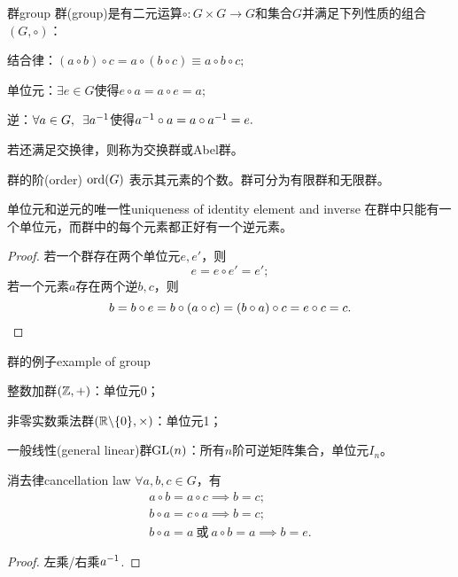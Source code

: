 \begin{definition}{群}{group}
	群(group)是有二元运算$\circ:G\times G\to G$和集合$G$并满足下列性质的组合$(G,\circ)$：
	\begin{compactitem}
		\item 结合律：$(a\circ b)\circ c=a\circ(b\circ c)\equiv a\circ b\circ c;$
		\item 单位元：$\exists e\in G$使得$e\circ a=a\circ e=a;$
		\item 逆：$\forall a\in G,\enspace\exists a^{-1}$使得$a^{-1}\circ a=a\circ a^{-1}=e.$
	\end{compactitem}
	若还满足交换律，则称为交换群或Abel群。

	\tcblower
	群的阶(order) $\operatorname{ord}(G)$ 表示其元素的个数。群可分为有限群和无限群。
\end{definition}
\begin{theorem}{单位元和逆元的唯一性}{uniqueness of identity element and inverse}
	在群中只能有一个单位元，而群中的每个元素都正好有一个逆元素。
\end{theorem}
\begin{proof}
	若一个群存在两个单位元$e,e'$，则 
	\[
		e=e\circ e'=e';
	\]
	若一个元素$a$存在两个逆$b,c$，则 
	\[
		b=b\circ e=b\circ(a\circ c)=(b\circ a)\circ c=e\circ c=c.
		\qedhere
	\]
\end{proof}
\begin{example}{群的例子}{example of group}
	\begin{compactitem}
		\item 整数加群$(\mathbb Z,+)$：单位元0；
		\item 非零实数乘法群$(\mathbb R\backslash\{0\},\times)$：单位元1；
		\item 一般线性(general linear)群$\operatorname{GL}(n)$：所有$n$阶可逆矩阵集合，单位元$I_n$。
	\end{compactitem}
\end{example}
\begin{theorem}{消去律}{cancellation law}
	$\forall a,b,c\in G$，有
	\begin{subequations}
		\begin{gather}
			a\circ b=a\circ c\implies b=c;\\
			b\circ a=c\circ a\implies b=c;\\
			b\circ a=a~\text{或}~a\circ b=a\implies b=e.
		\end{gather}
	\end{subequations}
\end{theorem}
\begin{proof}
	左乘/右乘$a^{-1}$.
\end{proof}
